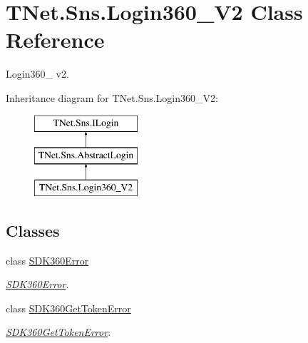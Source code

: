 \hypertarget{class_t_net_1_1_sns_1_1_login360___v2}{}\section{T\+Net.\+Sns.\+Login360\+\_\+\+V2 Class Reference}
\label{class_t_net_1_1_sns_1_1_login360___v2}


Login360\+\_\+ v2.  


Inheritance diagram for T\+Net.\+Sns.\+Login360\+\_\+\+V2\+:\begin{figure}[H]
\begin{center}
\leavevmode
\includegraphics[height=3.000000cm]{class_t_net_1_1_sns_1_1_login360___v2}
\end{center}
\end{figure}
\subsection*{Classes}
\begin{DoxyCompactItemize}
\item 
class \mbox{\hyperlink{class_t_net_1_1_sns_1_1_login360___v2_1_1_s_d_k360_error}{S\+D\+K360\+Error}}
\begin{DoxyCompactList}\small\item\em \mbox{\hyperlink{class_t_net_1_1_sns_1_1_login360___v2_1_1_s_d_k360_error}{S\+D\+K360\+Error}}. \end{DoxyCompactList}\item 
class \mbox{\hyperlink{class_t_net_1_1_sns_1_1_login360___v2_1_1_s_d_k360_get_token_error}{S\+D\+K360\+Get\+Token\+Error}}
\begin{DoxyCompactList}\small\item\em \mbox{\hyperlink{class_t_net_1_1_sns_1_1_login360___v2_1_1_s_d_k360_get_token_error}{S\+D\+K360\+Get\+Token\+Error}}. \end{DoxyCompactList}\end{DoxyCompactItemize}
